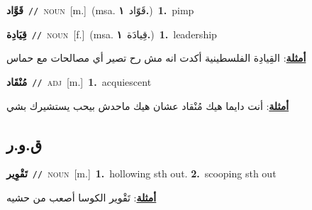 \documentclass[10pt,a4paper,twoside]{article} %
\begin{document}
\begin{multicols}{2}
{\setlength\topsep{0pt}\textbf{\foreignlanguage{arabic}{قَوَّاد}}\ {\color{gray}\texttt{//}\color{black}}\ \textsc{noun}\ [m.]\ \color{gray}(msa. \foreignlanguage{arabic}{قَوّاد}~\foreignlanguage{arabic}{\textbf{١.}})\color{black}\ \textbf{1.}~pimp\ } \vspace{2mm}

{\setlength\topsep{0pt}\textbf{\foreignlanguage{arabic}{قِيَادِة}}\ {\color{gray}\texttt{//}\color{black}}\ \textsc{noun}\ [f.]\ \color{gray}(msa. \foreignlanguage{arabic}{قِيادَة}~\foreignlanguage{arabic}{\textbf{١.}})\color{black}\ \textbf{1.}~leadership\  \begin{flushright}\color{gray}\foreignlanguage{arabic}{\textbf{\underline{\foreignlanguage{arabic}{أمثلة}}}: القِيادِة الفلسطينية أكدت انه مش رح تصير أي مصالحات مع حماس}\end{flushright}\color{black}} \vspace{2mm}

{\setlength\topsep{0pt}\textbf{\foreignlanguage{arabic}{مُنْقَاد}}\ {\color{gray}\texttt{//}\color{black}}\ \textsc{adj}\ [m.]\ \textbf{1.}~acquiescent\  \begin{flushright}\color{gray}\foreignlanguage{arabic}{\textbf{\underline{\foreignlanguage{arabic}{أمثلة}}}: أنت دايما هيك مُنْقاد عشان هيك ماحدش بيحب يستشيرك بشي}\end{flushright}\color{black}} \vspace{2mm}

\vspace{-3mm}
\subsection*{\color{blue}\foreignlanguage{arabic}{ق.و.ر}\color{blue}{}} 

{\setlength\topsep{0pt}\textbf{\foreignlanguage{arabic}{تَقْوِير}}\ {\color{gray}\texttt{//}\color{black}}\ \textsc{noun}\ [m.]\ \textbf{1.}~hollowing sth out.  \textbf{2.}~scooping sth out\  \begin{flushright}\color{gray}\foreignlanguage{arabic}{\textbf{\underline{\foreignlanguage{arabic}{أمثلة}}}: تَقْوير الكوسا أصعب من حشيه}\end{flushright}\color{black}} \vspace{2mm}


\end{multicols}
\end{document}
